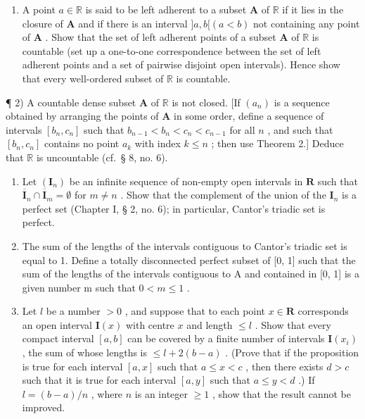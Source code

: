 \BourbakiExerciseGroup

\begin{enumerate}
\def\labelenumi{\arabic{enumi})}
\tightlist
\item
  A point \(a \in \mathbb{R}\) is said to be left adherent to a subset \(\mathbf{A}\) of \(\mathbb{R}\) if it lies in the closure of \(\mathbf{A}\) and if there is an interval \(]a, b[ (a < b)\) not containing any point of \(\mathbf{A}\) . Show that the set of left adherent points of a subset \(\mathbf{A}\) of \(\mathbb{R}\) is countable (set up a one-to-one correspondence between the set of left adherent points and a set of pairwise disjoint open intervals). Hence show that every well-ordered subset of \(\mathbb{R}\) is countable.
\end{enumerate}

¶ 2) A countable dense subset \(\mathbf{A}\) of \(\mathbb{R}\) is not closed. {[}If \((a_{n})\) is a sequence obtained by arranging the points of \(\mathbf{A}\) in some order, define a sequence of intervals \([b_{n}, c_{n}]\) such that \(b_{n-1} < b_{n} < c_{n} < c_{n-1}\) for all \(n\) , and such that \([b_{n}, c_{n}]\) contains no point \(a_{k}\) with index \(k \leqslant n\) ; then use Theorem 2.{]} Deduce that \(\mathbb{R}\) is uncountable (cf.~§ 8, no. 6).

\begin{enumerate}
\def\labelenumi{\arabic{enumi})}
\setcounter{enumi}{2}
\item
  Let \((\mathbf{I}_n)\) be an infinite sequence of non-empty open intervals in \(\mathbf{R}\) such that \(\overline{\mathbf{I}}_n \cap \overline{\mathbf{I}}_m = \emptyset\) for \(m \neq n\) . Show that the complement of the union of the \(\mathbf{I}_n\) is a perfect set (Chapter I, § 2, no. 6); in particular, Cantor's triadic set is perfect.
\item
  The sum of the lengths of the intervals contiguous to Cantor's triadic set is equal to 1. Define a totally disconnected perfect subset of {[}0, 1{]} such that the sum of the lengths of the intervals contiguous to A and contained in {[}0, 1{]} is a given number m such that \(0 < m \leqslant 1\) .
\item
  Let \(l\) be a number \(> 0\) , and suppose that to each point \(x \in \mathbf{R}\) corresponds an open interval \(\mathbf{I}(x)\) with centre \(x\) and length \(\leqslant l\) . Show that every compact interval \([a, b]\) can be covered by a finite number of intervals \(\mathbf{I}(x_i)\) , the sum of whose lengths is \(\leqslant l + 2(b - a)\) . (Prove that if the proposition is true for each interval \([a, x]\) such that \(a \leqslant x < c\) , then there exists \(d > c\) such that it is true for each interval \([a, y]\) such that \(a \leqslant y < d\) .) If \(l = (b - a)/n\) , where \(n\) is an integer \(\geqslant 1\) , show that the result cannot be improved.
\end{enumerate}

